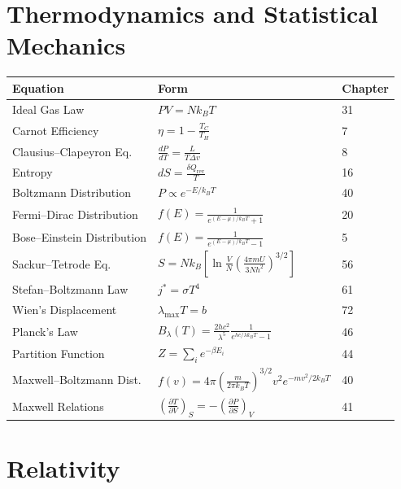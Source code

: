 \section*{Thermodynamics and Statistical Mechanics}

\begin{center}
\begin{tabular}{lll}
\hline
\textbf{Equation} & \textbf{Form} & \textbf{Chapter} \\
\hline
Ideal Gas Law & $PV = Nk_BT$ & 31 \\
Carnot Efficiency & $\eta = 1 - \frac{T_C}{T_H}$ & 7 \\
Clausius--Clapeyron Eq. & $\frac{dP}{dT} = \frac{L}{T\Delta v}$ & 8 \\
Entropy & $dS = \frac{\delta Q_{\text{rev}}}{T}$ & 16 \\
Boltzmann Distribution & $P \propto e^{-E/k_BT}$ & 40 \\
Fermi--Dirac Distribution & $f(E) = \frac{1}{e^{(E-\mu)/k_BT} + 1}$ & 20 \\
Bose--Einstein Distribution & $f(E) = \frac{1}{e^{(E-\mu)/k_BT} - 1}$ & 5 \\
Sackur--Tetrode Eq. & $S = Nk_B \left[\ln\frac{V}{N}\left(\frac{4\pi mU}{3Nh^2}\right)^{3/2}\right]$ & 56 \\
Stefan--Boltzmann Law & $j^* = \sigma T^4$ & 61 \\
Wien's Displacement & $\lambda_{\max} T = b$ & 72 \\
Planck's Law & $B_\lambda(T) = \frac{2hc^2}{\lambda^5}\frac{1}{e^{hc/\lambda k_BT} - 1}$ & 46 \\
Partition Function & $Z = \sum_i e^{-\beta E_i}$ & 44 \\
Maxwell--Boltzmann Dist. & $f(v) = 4\pi\left(\frac{m}{2\pi k_BT}\right)^{3/2}v^2 e^{-mv^2/2k_BT}$ & 40 \\
Maxwell Relations & $\left(\frac{\partial T}{\partial V}\right)_S = -\left(\frac{\partial P}{\partial S}\right)_V$ & 41 \\
\hline
\end{tabular}
\end{center}

\section*{Relativity}

